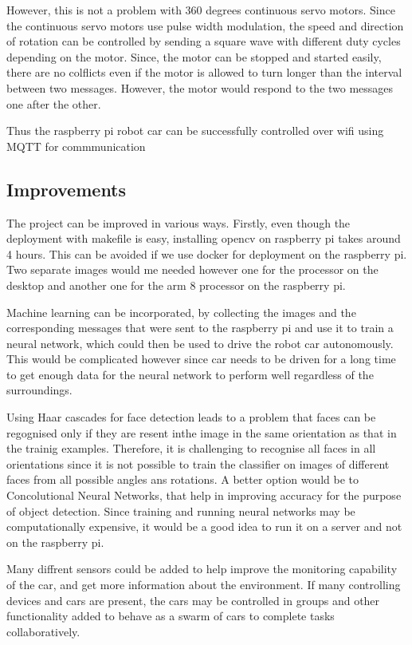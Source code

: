 \documentclass[sigconf]{acmart}
\begin{document}
However, this is not a problem with 360 degrees continuous servo motors. Since the continuous servo motors use pulse width modulation, the speed and direction of rotation can be controlled by sending a square wave with different duty cycles depending on the motor. Since, the motor can be stopped and started easily, there are no colflicts even if the motor is allowed to turn longer than the interval between two messages. However, the motor would respond to the two messages one after the other.

Thus the raspberry pi robot car can be successfully controlled over wifi using MQTT for commmunication

\subsection{Improvements}

The project can be improved in various ways. Firstly, even though the deployment with makefile is easy, installing opencv on raspberry pi takes around 4 hours. This can be avoided if we use docker for deployment on the raspberry pi. Two separate images would me needed however one for the processor on the desktop and another one for the arm 8 processor on the raspberry pi.

Machine learning can be incorporated, by collecting the images and the corresponding messages that were sent to the raspberry pi and use it to train a neural network, which could then be used to drive the robot car autonomously. This would be complicated however since car needs to be driven for a long time to get enough data for the neural network to perform well regardless of the surroundings.

Using Haar cascades for face detection leads to a problem that faces can be regognised only if they are resent inthe image in the same orientation as that in the trainig examples. Therefore, it is challenging to recognise all faces in all orientations since it is not possible to train the classifier on images of different faces from all possible angles ans rotations. A better option would be to Concolutional Neural Networks, that help in improving accuracy for the purpose of object detection. Since training and running neural networks may be computationally expensive, it would be a good idea to run it on a server and not on the raspberry pi.

Many diffrent sensors could be added to help improve the monitoring capability of the car, and get more information about the environment.
If many controlling devices and cars are present, the cars may be controlled in groups and other functionality added to behave as a swarm of cars to complete tasks collaboratively.
\end{document}
